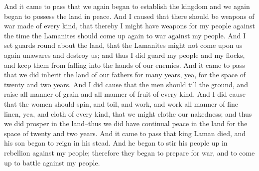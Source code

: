 \bchapter
\bverse \iffalse And it came to pass that we again began to establish the kingdom and we again began to possess the land in peace. And I caused that there should be weapons of war made of every kind, that thereby I might have weapons for my people against the time the Lamanites should come up again to war against my people. \fi
And it came to pass that we again began to establish the kingdom and we again began to possess the land in peace. And I caused that there should be weapons of war made of every kind, that thereby I might have weapons for my people against the time the Lamanites should come up again to war against my people.
\bverse \iffalse And I set guards round about the land, that the Lamanites might not come upon us again unawares and destroy us; and thus I did guard my people and my flocks, and keep them from falling into the hands of our enemies. \fi
And I set guards round about the land, that the Lamanites might not come upon us again unawares and destroy us; and thus I did guard my people and my flocks, and keep them from falling into the hands of our enemies.
\bverse \iffalse And it came to pass that we did inherit the land of our fathers for many years, yea, for the space of twenty and two years. \fi
And it came to pass that we did inherit the land of our fathers for many years, yea, for the space of twenty and two years.
\bverse \iffalse And I did cause that the men should till the ground, and raise all manner of grain and all manner of fruit of every kind. \fi
And I did cause that the men should till the ground, and raise all manner of grain and all manner of fruit of every kind.
\bverse \iffalse And I did cause that the women should spin, and toil, and work, and work all manner of fine linen, yea, and cloth of every kind, that we might clothe our nakedness; and thus we did prosper in the land--thus we did have continual peace in the land for the space of twenty and two years. \fi
And I did cause that the women should spin, and toil, and work, and work all manner of fine linen, yea, and cloth of every kind, that we might clothe our nakedness; and thus we did prosper in the land--thus we did have continual peace in the land for the space of twenty and two years.
\bverse \iffalse And it came to pass that king Laman died, and his son began to reign in his stead. And he began to stir his people up in rebellion against my people; therefore they began to prepare for war, and to come up to battle against my people. \fi
And it came to pass that king Laman died, and his son began to reign in his stead. And he began to stir his people up in rebellion against my people; therefore they began to prepare for war, and to come up to battle against my people.
